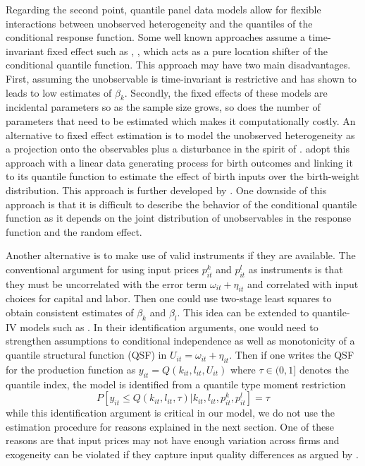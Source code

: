 \documentclass[11pt]{article}
\begin{document}
Regarding the second point, quantile panel data models allow for flexible interactions between unobserved heterogeneity and the quantiles of the conditional response function. Some well known approaches assume a time-invariant fixed effect such as \cite{Koenker2004}, \cite{Lamarche2010}, \cite{Canay2011} which acts as a pure location shifter of the conditional quantile function. This approach may have two main disadvantages. First, assuming the unobservable is time-invariant is restrictive and \cite{Griliches1986} has shown to leads to low estimates of $\beta_{k}$. Secondly, the fixed effects of these models are incidental parameters so as the sample size grows, so does the number of parameters that need to be estimated which makes it computationally costly. An alternative to fixed effect estimation is to model the unobserved heterogeneity as a projection onto the observables plus a disturbance in the spirit of \cite{Chamberlain1984}. \cite{Abrevaya2008} adopt this approach with a linear data generating process for birth outcomes and linking it to its quantile function to estimate the effect of birth inputs over the birth-weight distribution. This approach is further developed by \cite{Bache2012}. One downside of this approach is that it is difficult to describe the behavior of the conditional quantile function as it depends on the joint distribution of unobservables in the response function and the random effect.

Another alternative is to make use of valid instruments if they are available. The conventional argument for using input prices $p^{k}_{it}$ and $p^{l}_{it}$ as instruments is that they must be uncorrelated with the error term $\omega_{it}+\eta_{it}$ and correlated with input choices for capital and labor. Then one could use two-stage least squares to obtain consistent estimates of $\beta_{k}$ and $\beta_{l}$. This idea can be extended to quantile-IV models such as \cite{Chernozhukov2005}. In their identification arguments, one would need to strengthen assumptions to conditional independence as well as monotonicity of a quantile structural function (QSF) in $U_{it}=\omega_{it}+\eta_{it}$. Then if one writes the QSF for the production function as $y_{it}=Q(k_{it}, l_{it}, U_{it})$ where $\tau\in (0,1]$ denotes the quantile index, the model is identified from a quantile type moment restriction
\begin{equation}
P[y_{it}\leq Q(k_{it}, l_{it}, \tau)|k_{it}, l_{it}, p^{k}_{it}, p^{l}_{it}]=\tau
\end{equation}
while this identification argument is critical in our model, we do not use the estimation procedure for reasons explained in the next section. One of these reasons are that input prices may not have enough variation across firms and exogeneity can be violated if they capture input quality differences as argued by \cite{Griliches1986}.
\end{document}
